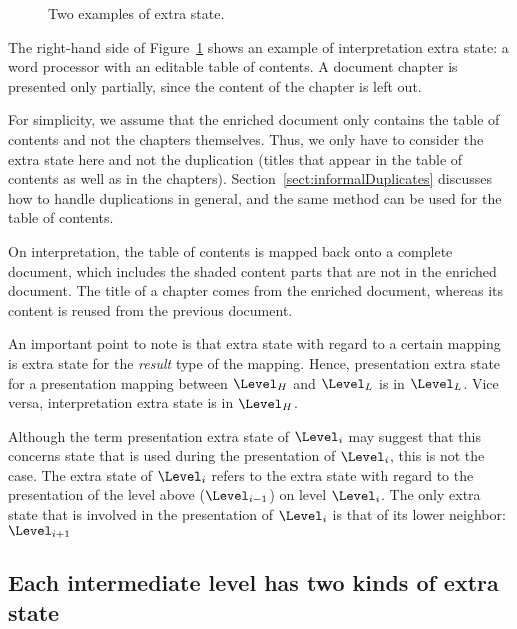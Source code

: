 \begin{figure}
\begin{center}
\begin{center}
\end{center}
\caption{Two examples of extra state.} \label{layerExtraState} 
\end{center}
\end{figure}


The right-hand side of Figure~\ref{layerExtraState} shows an example of interpretation extra state: a word processor with an editable table of contents. A document chapter is presented only partially, since the content of the chapter is left out.

For simplicity, we assume that the enriched document only contains the table of contents and not the chapters themselves. Thus, we only have to consider the extra state here and not the duplication (titles that appear in the table of contents as well as in the chapters). Section~\ref{sect:informalDuplicates} discusses how to handle duplications in general, and the same method can be used for the table of contents.

On interpretation, the table of contents is mapped back onto a complete document, which includes the shaded content parts that are not in the enriched document. The title of a chapter comes from the enriched document, whereas its content is reused from the previous document.  



\bc
An important point to note is that extra state with regard to a certain mapping is extra state for the {\em result} type of the mapping. Hence, presentation extra state for a presentation mapping between $\Level_{H}$ and $\Level_{L}$ is in $\Level_{L}$. Vice versa, interpretation extra state is in $\Level_{H}$.
\ec

\bc Although the term presentation extra state of $\Level_i$ may suggest that this concerns state that is used during the presentation of $\Level_i$, this is not the case. The extra state of $\Level_i$ refers to the extra state with regard to the presentation of the level above ($\Level_{i-1}$) on level $\Level_i$. The only extra state that is involved in the presentation of $\Level_i$ is that of its lower neighbor: $\Level_{i+1}$
\ec


%																
\subsection{Each intermediate level has two kinds of extra state} \label{sect:oneLevelDoubleES}

